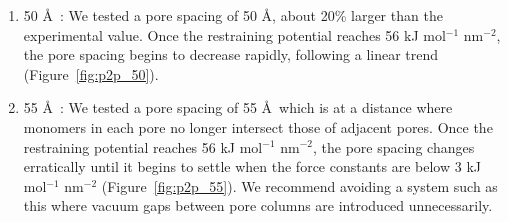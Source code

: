 \documentclass{article}
\begin{document}
\begin{enumerate}
	\item 50 \AA~: We tested a pore spacing of 50 \AA, about 20\%
	larger than the experimental value. Once the restraining potential reaches 56
	kJ mol$^{-1}$ nm$^{-2}$, the pore spacing begins to decrease rapidly, following
	a linear trend (Figure~\ref{fig:p2p_50}).
                
	\item 55 \AA~: We tested a pore spacing of 55 \AA~which is at
	a distance where monomers in each pore no longer intersect those of adjacent pores. Once
	the restraining potential reaches 56 kJ mol$^{-1}$ nm$^{-2}$, the pore spacing
	changes erratically until it begins to settle when the force constants are
	below 3 kJ mol$^{-1}$ nm$^{-2}$ (Figure~\ref{fig:p2p_55}). We recommend
	avoiding a system such as this where vacuum gaps between pore columns are
	introduced unnecessarily. 

	\end{enumerate} 
\end{document}
